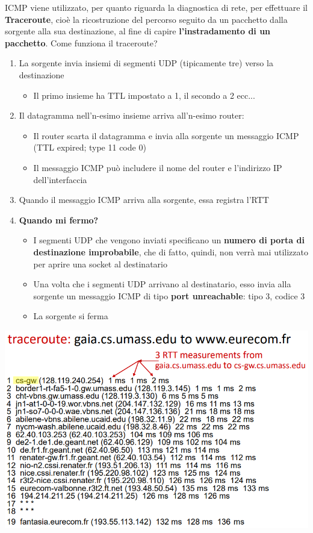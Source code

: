 \documentclass[12pt]{article}
\begin{document}
ICMP viene utilizzato, per quanto riguarda la diagnostica di rete, per effettuare il \textbf{Traceroute}, cioè la ricostruzione
del percorso seguito da un pacchetto dalla sorgente alla sua destinazione, al fine di capire \textbf{l'instradamento di un pacchetto}.
Come funziona il traceroute?
\begin{enumerate}
    \item La sorgente invia insiemi di segmenti UDP (tipicamente tre) verso la destinazione
    \begin{itemize}
        \item Il primo insieme ha TTL impostato a 1, il secondo a 2 ecc...
    \end{itemize}
    \item Il datagramma nell'n-esimo insieme arriva all'n-esimo router:
    \begin{itemize}
        \item Il router scarta il datagramma e invia alla sorgente un messaggio ICMP (TTL expired; type 11 code 0)
        \item Il messaggio ICMP può includere il nome del router e l'indirizzo IP dell'interfaccia
    \end{itemize}
    \item Quando il messaggio ICMP arriva alla sorgente, essa registra l'RTT
    \item \textbf{Quando mi fermo?}
    \begin{itemize}
        \item I segmenti UDP che vengono inviati specificano un \textbf{numero di porta di destinazione improbabile}, che di fatto, quindi, non verrà mai utilizzato per aprire una socket al destinatario
        \item Una volta che i segmenti UDP arrivano al destinatario, esso invia alla sorgente un messaggio ICMP di tipo \textbf{port unreachable}: tipo 3, codice 3
        \item La sorgente si ferma
    \end{itemize}
\end{enumerate}
\begin{center}
    \includegraphics[width =0.75\linewidth]{Images/117.png}
\end{center}
\end{document}
